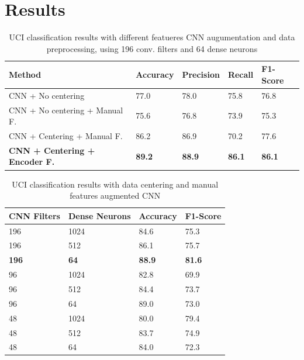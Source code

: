 
\section{Results}
\label{sec:results}

\begin{table}[t]
	\begin{center}
		\begin{tabular}{ p{7cm}p{2cm}p{2cm}p{2cm}p{2cm} } 
			\hline
			Method & Accuracy & Precision & Recall & F1-Score \\ 
			\hline
			CNN + No centering & 77.0 & 78.0 & 75.8 & 76.8 \\ 
			CNN + No centering + Manual F. & 75.6 & 76.8 & 73.9 & 75.3 \\
			CNN + Centering + Manual F. & 86.2 & 86.9 & 70.2 & 77.6 \\ 
			\textbf{CNN + Centering + Encoder F.} & \textbf{89.2} & \textbf{88.9} &  \textbf{86.1} & \textbf{86.1} \\ 
			\hline
		\end{tabular}
	\caption{\label{tab:model-performance} UCI classification results with different featueres CNN augumentation and data preprocessing, using 196 conv. filters and 64 dense neurons}
	\end{center}
\end{table}

\begin{table}
	\begin{center}
		\begin{tabular}{ p{1.8cm}p{1.7cm}p{1.7cm}p{1.7cm} } 
			\hline
			CNN Filters & Dense Neurons & Accuracy & F1-Score \\ 
			\hline
			196 & 1024 & 84.6 & 75.3 \\
			196 & 512 & 86.1 & 75.7 \\ 
			\textbf{196} & \textbf{64} & \textbf{88.9} & \textbf{81.6} \\ 
			96 & 1024 & 82.8 & 69.9 \\
			96 & 512 & 84.4 & 73.7 \\ 
			96 & 64 & 89.0 & 73.0 \\  
			48 & 1024 & 80.0 & 79.4 \\
			48 & 512 & 83.7 & 74.9 \\ 
			48 & 64 & 84.0 & 72.3 \\
			\hline
		\end{tabular}
	\caption{\label{tab:model-selection} UCI classification results with data centering and manual features augmented CNN}
	\end{center}
\end{table}

